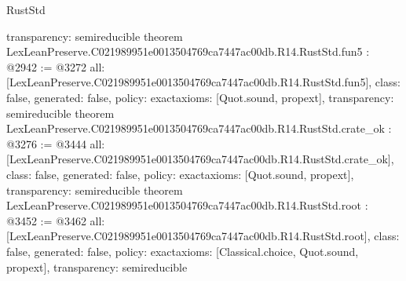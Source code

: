 \begin{lexlean}{RustStd}
\begin{coremodule}
{  transparency: semireducible
}
theorem LexLeanPreserve.C021989951e0013504769ca7447ac00db.R14.RustStd.fun5 : @2942 := @3272 {
  all: [LexLeanPreserve.C021989951e0013504769ca7447ac00db.R14.RustStd.fun5],
  class: false,
  generated: false,
  policy: exact{axioms: [Quot.sound, propext]},
  transparency: semireducible
}
theorem LexLeanPreserve.C021989951e0013504769ca7447ac00db.R14.RustStd.crate_ok : @3276 := @3444 {
  all: [LexLeanPreserve.C021989951e0013504769ca7447ac00db.R14.RustStd.crate_ok],
  class: false,
  generated: false,
  policy: exact{axioms: [Quot.sound, propext]},
  transparency: semireducible
}
theorem LexLeanPreserve.C021989951e0013504769ca7447ac00db.R14.RustStd.root : @3452 := @3462 {
  all: [LexLeanPreserve.C021989951e0013504769ca7447ac00db.R14.RustStd.root],
  class: false,
  generated: false,
  policy: exact{axioms: [Classical.choice, Quot.sound, propext]},
  transparency: semireducible
}


\end{coremodule}
\end{lexlean}
